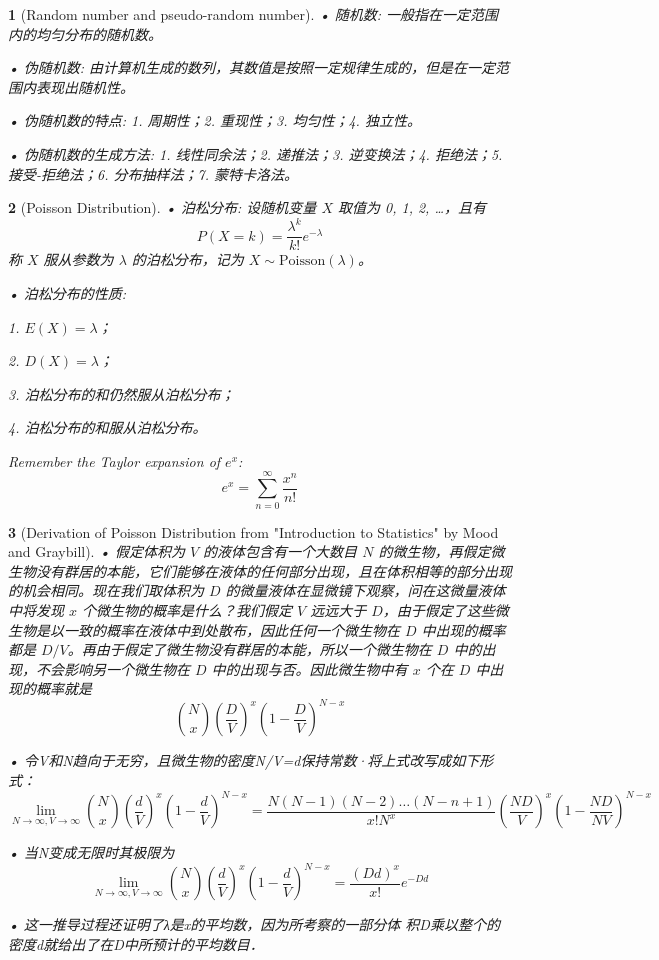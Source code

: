 \documentclass[UTF8]{report}
\theoremstyle{MyLineTheoremStyle} %
\theoremstyle{MyBlockTheoremStyle} %
\theoremstyle{MySubsubsectionStyle} %
\newtheorem{definition}{}
\begin{document}
\begin{definition}[Random number and pseudo-random number]
    • 随机数: 一般指在一定范围内的均匀分布的随机数。\par
    • 伪随机数: 由计算机生成的数列，其数值是按照一定规律生成的，但是在一定范围内表现出随机性。\par
    • 伪随机数的特点: 1. 周期性；2. 重现性；3. 均匀性；4. 独立性。\par
    • 伪随机数的生成方法: 1. 线性同余法；2. 递推法；3. 逆变换法；4. 拒绝法；5. 接受-拒绝法；6. 分布抽样法；7. 蒙特卡洛法。
\end{definition}

\begin{definition}[Poisson Distribution]
    • 泊松分布: 设随机变量 \(X\) 取值为 0, 1, 2, \ldots，且有
    \[
    P(X = k) = \frac{\lambda^k}{k!} e^{-\lambda}
    \]
    称 \(X\) 服从参数为 \(\lambda\) 的泊松分布，记为 \(X \sim \text{Poisson}(\lambda)\)。\par
    • 泊松分布的性质: \par
    1. \(E(X) = \lambda\)；\par
    2. \(D(X) = \lambda\)；\par
    3. 泊松分布的和仍然服从泊松分布；\par
    4. 泊松分布的和服从泊松分布。\par
    Remember the Taylor expansion of \(e^x\):
    \[
    e^x = \sum_{n=0}^{\infty} \frac{x^n}{n!}
    \]

\end{definition}

\begin{definition}[Derivation of Poisson Distribution from "Introduction to Statistics" by Mood and Graybill]
    • 假定体积为 \(V\) 的液体包含有一个大数目 \(N\) 的微生物，再假定微生物没有群居的本能，它们能够在液体的任何部分出现，且在体积相等的部分出现的机会相同。现在我们取体积为 \(D\) 的微量液体在显微镜下观察，问在这微量液体中将发现 \(x\) 个微生物的概率是什么？我们假定 \(V\) 远远大于 \(D\)，由于假定了这些微生物是以一致的概率在液体中到处散布，因此任何一个微生物在 \(D\) 中出现的概率都是 \(D/V\)。再由于假定了微生物没有群居的本能，所以一个微生物在 \(D\) 中的出现，不会影响另一个微生物在 \(D\) 中的出现与否。因此微生物中有 \(x\) 个在 \(D\) 中出现的概率就是
    \[
    \binom{N}{x} \left(\frac{D}{V}\right)^x \left(1 - \frac{D}{V}\right)^{N-x}
    \]\par
    • 令V和N趋向于无穷，且微生物的密度N/V=d保持常数·将上式改写成如下形式：
        \[
        \lim_{N \to \infty ,V \to \infty} \binom{N}{x} \left(\frac{d}{V}\right)^x \left(1 - \frac{d}{V}\right)^{N-x} = \frac{N(N-1)(N-2)\dots(N-n+1)}{x!N^x} (\frac{ND}{V})^x( 1 - \frac{ND}{NV})^{N-x}
        \]\par
        • 当N变成无限时其极限为
        \[
        \lim_{N \to \infty,V \to \infty} \binom{N}{x} \left(\frac{d}{V}\right)^x \left(1 - \frac{d}{V}\right)^{N-x} = \frac{(Dd)^x}{x!} e^{-Dd}
        \]\par
        • 这一推导过程还证明了λ是x的平均数，因为所考察的一部分体
    积D乘以整个的密度d就给出了在D中所预计的平均数目．
    
\end{definition}
\end{document}

